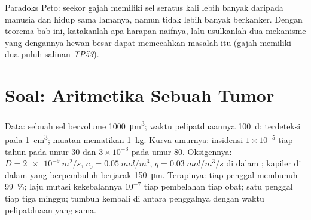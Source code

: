 \begin{exercise}[$\star\star\star$]\label{exo:b3:cancer-biology:12}
Paradoks Peto: seekor gajah memiliki sel seratus kali lebih banyak daripada
manusia dan hidup sama lamanya, namun tidak lebih banyak berkanker. Dengan
teorema bab ini, katakanlah apa harapan naifnya, lalu usulkanlah dua
mekanisme yang dengannya hewan besar dapat memecahkan masalah itu (gajah
memiliki dua puluh salinan \emph{TP53}).
\end{exercise}

\section{Soal: Aritmetika Sebuah Tumor}

\begin{problem}
\label{pb:b3:cancer-biology:1}
Data: sebuah sel  bervolume \qty{1000}{\micro m^3}; waktu
pelipatduaannya \qty{100}{d}; terdeteksi pada \qty{1}{cm^3}; muatan mematikan
\qty{1}{kg}. Kurva umurnya: insidensi $1\times 10^{-5}$ tiap tahun pada umur
$30$ dan $3\times
10^{-3}$ pada umur $80$. Oksigennya: $D = \qty{2e-9}{m^2/s}$, $c_{0} =
\qty{0.05}{mol/m^3}$, $q = \qty{0.03}{mol/m^3/s}$ di dalam ;
kapiler di dalam  yang berpembuluh berjarak \qty{150}{\micro m}. Terapinya:
tiap penggal membunuh \qty{99}{\%}; laju mutasi kekebalannya $10^{-7}$ tiap
pembelahan tiap obat; satu penggal tiap tiga minggu;  tumbuh kembali
di antara penggalnya dengan waktu pelipatduaan yang sama.


\end{problem}
